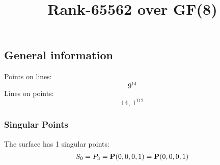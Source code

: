 \documentclass{article}
\newcommand\setTBstruts{\def\T{\rule{0pt}{2.6ex}}%
\def\B{\rule[-1.2ex]{0pt}{0pt}}}
\newcommand{\bP}{{\bf P}}
\begin{document}
 
\setTBstruts



{\allowdisplaybreaks%






\title{Rank-65562 over GF(8)}
\author{}%
\maketitle%
%
{}



\subsection*{General information}
Points on lines:
$$
9^{14}$$
Lines on points:
$$
14,\,1^{112}$$
\subsubsection*{Singular Points}
The surface has 1 singular points:\\
\begin{align*}
S_{0} &= P_{3}=\bP(0, 0, 0, 1) = \bP(0, 0, 0, 1)\\
\end{align*}
}
\end{document}
